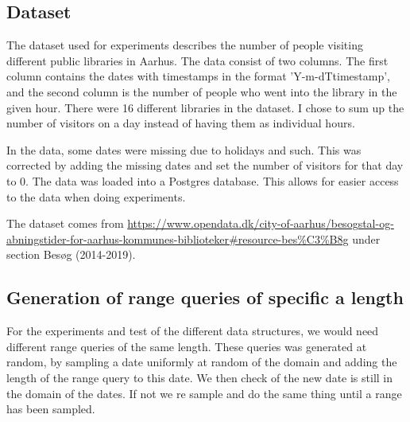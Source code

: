 \documentclass[11pt]{article}
\theoremstyle{definition}
\begin{document}
\subsection{Dataset}
The dataset used for experiments describes the number of people visiting different public libraries in Aarhus.  The data consist of two columns. The first column contains the dates with timestamps in the format 'Y-m-dTtimestamp', and the second column is the number of people who went into the library in the given hour. There were 16 different libraries in the dataset. I chose to sum up the number of visitors on a day instead of having them as individual hours.

In the data, some dates were missing due to holidays and such. This was corrected by adding the missing dates and set the number of visitors for that day to $0$.  The data was loaded into a Postgres database. This allows for easier access to the data when doing experiments. 

The dataset comes from \url{https://www.opendata.dk/city-of-aarhus/besogstal-og-abningstider-for-aarhus-kommunes-biblioteker#resource-bes\%C3\%B8g} under section Besøg (2014-2019).

\subsection{Generation of range queries of specific a length}
For the experiments and test of the different data structures, we would need different range queries of the same length. These queries was generated at random, by sampling a date uniformly at random of the domain and adding the length of the range query to this date. We then check of the new date is still in the domain of the dates. If not we re sample and do the same thing until a range has been sampled.  
\end{document}
